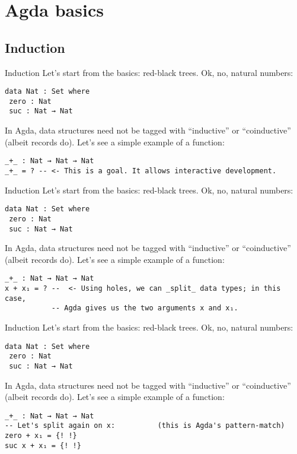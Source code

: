 \documentclass[t,aspectratio=169,9pt]{beamer}
\begin{document}
\section[basics]{Agda basics}
\subsection[induction]{Induction}
\begin{frame}[fragile]{Induction}
  Let's start from the basics: red-black trees. Ok, no, natural numbers:
\begin{verbatim}
data Nat : Set where
 zero : Nat
 suc : Nat → Nat
\end{verbatim}
  In Agda, data structures need not be tagged with ``inductive'' or
  ``coinductive'' (albeit records do).
  Let's see a simple example of a function:
\begin{verbatim}
_+_ : Nat → Nat → Nat
_+_ = ? -- <- This is a goal. It allows interactive development.
\end{verbatim}
\end{frame}
\begin{frame}{Induction}
  Let's start from the basics: red-black trees. Ok, no, natural numbers:
\begin{verbatim}
data Nat : Set where
 zero : Nat
 suc : Nat → Nat
\end{verbatim}
  In Agda, data structures need not be tagged with ``inductive'' or
  ``coinductive'' (albeit records do).
  Let's see a simple example of a function:
\begin{verbatim}
_+_ : Nat → Nat → Nat
x + x₁ = ? --  <- Using holes, we can _split_ data types; in this case,
           -- Agda gives us the two arguments x and x₁.
\end{verbatim}
\end{frame}
\begin{frame}{Induction}
  Let's start from the basics: red-black trees. Ok, no, natural numbers:
\begin{verbatim}
data Nat : Set where
 zero : Nat
 suc : Nat → Nat
\end{verbatim}
  In Agda, data structures need not be tagged with ``inductive'' or
  ``coinductive'' (albeit records do).
  Let's see a simple example of a function:
\begin{verbatim}
_+_ : Nat → Nat → Nat
-- Let's split again on x:          (this is Agda's pattern-match)
zero + x₁ = {! !}
suc x + x₁ = {! !}
\end{verbatim}
\end{frame}
\end{document}
